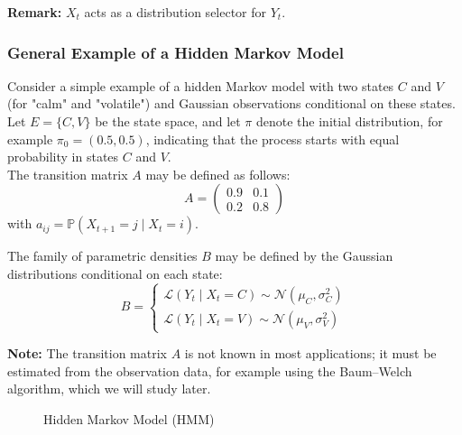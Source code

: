 \documentclass[11pt]{article}
\begin{document}
\textbf{Remark:}
$X_t$ acts as a distribution selector for $Y_t$.
\vspace{0.3cm}

\subsubsection{General Example of a Hidden Markov Model}

Consider a simple example of a hidden Markov model with two states $C$ and $V$ (for "calm" and "volatile") and Gaussian observations conditional on these states.\\
Let $E = \{C, V\}$ be the state space, and let $\pi$ denote the initial distribution, for example $\pi_0 = (0.5, 0.5)$, indicating that the process starts with equal probability in states $C$ and $V$.\\
The transition matrix $A$ may be defined as follows:
\[
A =
\begin{pmatrix}
0.9 & 0.1 \\
0.2 & 0.8
\end{pmatrix}
\]
with $a_{ij} = \mathbb{P}(X_{t+1} = j \mid X_t = i)$.

\vspace{0.3cm}

The family of parametric densities $B$ may be defined by the Gaussian distributions conditional on each state:
\[
B =
\begin{cases}
\mathcal{L}(Y_t \mid X_t = C) \sim \mathcal{N}(\mu_C, \sigma_C^2) \\
\mathcal{L}(Y_t \mid X_t = V) \sim \mathcal{N}(\mu_V, \sigma_V^2)
\end{cases}
\]

\vspace{0.5cm}
\textbf{Note:}
The transition matrix $A$ is not known in most applications; it must be estimated from the observation data, for example using the Baum--Welch algorithm, which we will study later.
\vspace{1.5cm}

\begin{figure}[h]
\centering
{}
\caption{Hidden Markov Model (HMM)}
\end{figure}
\end{document}
